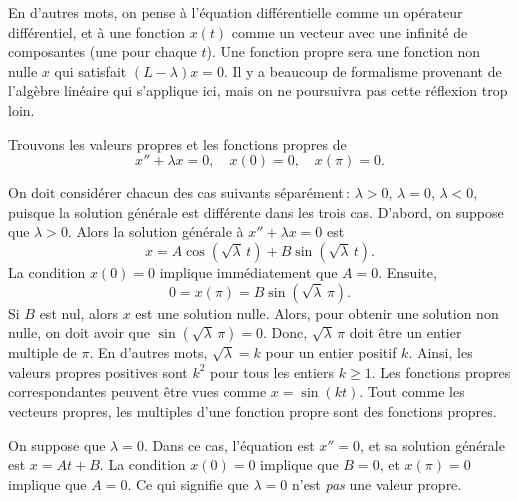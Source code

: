 En d'autres mots, on pense à l'équation différentielle comme un opérateur différentiel, et à une fonction $x(t)$
comme un vecteur avec une infinité de composantes (une pour chaque $t$).
Une fonction propre sera une fonction non nulle $x$ qui satisfait  
$(L- \lambda)x = 0$. Il y a beaucoup de formalisme provenant de l'algèbre linéaire qui s'applique ici, mais on ne poursuivra pas cette réflexion trop loin.  

\begin{example} \label{bvp:eig1ex}
Trouvons les valeurs propres et les fonctions propres de 
\begin{equation*}
x'' + \lambda x = 0, \quad x(0) = 0, \quad x(\pi) = 0 .
\end{equation*}

On doit considérer chacun des cas suivants séparément\,: $\lambda > 0$, $\lambda = 0$, $\lambda < 0$, puisque la solution générale est différente dans les trois cas.
D'abord, on suppose que $\lambda > 0$.  Alors la solution générale à $x''+\lambda x = 0$ est
\begin{equation*}
x = A \cos ( \sqrt{\lambda}\, t) + B \sin ( \sqrt{\lambda}\, t).
\end{equation*}
La condition $x(0) = 0$ implique immédiatement que $A = 0$.
Ensuite,
\begin{equation*}
0 = x(\pi) = B \sin ( \sqrt{\lambda}\, \pi ) .
\end{equation*}
Si $B$ est nul, alors $x$ est une solution nulle. Alors, pour obtenir une solution non nulle, on doit avoir que $\sin ( \sqrt{\lambda}\, \pi) = 0$.  Donc,
$\sqrt{\lambda}\, \pi$ doit être un entier multiple de $\pi$.  En d'autres mots,
 $\sqrt{\lambda} = k$ pour un entier positif $k$.
Ainsi, les valeurs propres positives sont 
$k^2$ pour tous les entiers $k \geq 1$.  Les fonctions propres correspondantes peuvent être vues comme $x=\sin (k t)$.  Tout comme les vecteurs propres, les multiples d'une fonction propre sont des fonctions propres. 

On suppose que $\lambda = 0$.  Dans ce cas, l'équation est $x'' = 0$,
et sa solution générale est $x = At + B$.  La condition  $x(0) = 0$ implique que 
 $B=0$, et $x(\pi) = 0$ implique que $A = 0$. Ce qui signifie que $\lambda
= 0$ n'est \emph{pas} une valeur propre.


\end{example}
